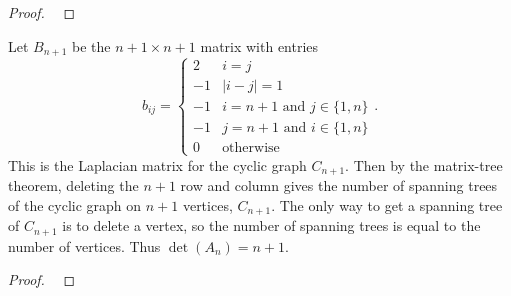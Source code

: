 \documentclass{article}
\newenvironment{problem}[2][Problem]{\begin{trivlist}
\item[\hskip \labelsep {\bfseries #1}\hskip \labelsep {\bfseries #2.}]}{\end{trivlist}}
\newcommand{\set}[1]{\{ #1 \}}
\begin{document}
\begin{proof} ~
\end{proof}
\pagebreak
\begin{problem}{5}
  Let $B_{n+1}$ be the $n + 1 \times n + 1$ matrix with entries \[
    b_{ij} = \begin{cases}
      2 & i = j \\
      -1 & |i - j| = 1 \\
      -1 & i = n + 1 \text{ and } j \in \set{1, n} \\
      -1 & j = n + 1 \text{ and } i \in \set{1, n} \\
      0 & \text{otherwise}
    \end{cases}.
  \] This is the Laplacian matrix for the cyclic graph $C_{n+1}$.
  Then by the matrix-tree theorem, deleting the $n+1$ row and column gives the
  number of spanning trees of the cyclic graph on $n+1$ vertices, $C_{n+1}$.
  The only way to get a spanning tree of $C_{n+1}$ is to delete a vertex,
  so the number of spanning trees is equal to the number of vertices. Thus
  $\det(A_n) = n + 1$.
\end{problem}

\begin{proof} ~
\end{proof}
\end{document}
